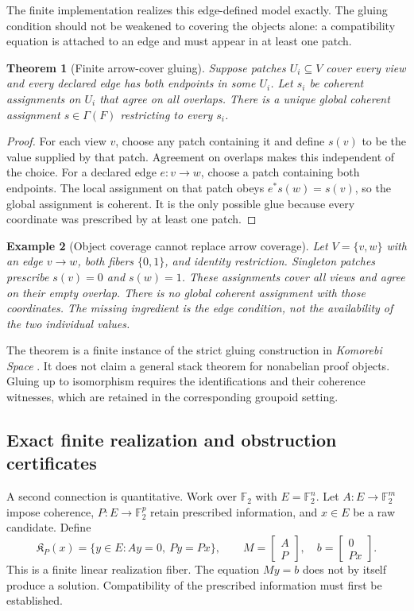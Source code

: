 \documentclass[11pt,oneside]{article}
\theoremstyle{komorebiplain}
\newtheorem{theorem}{Theorem}[section]
\theoremstyle{komorebidefinition}
\newtheorem{example}[theorem]{Example}
\theoremstyle{komorebiremark}
\begin{document}
The finite implementation  realizes this edge-defined model exactly. The gluing condition should not be weakened to covering the objects alone: a compatibility equation is attached to an edge and must appear in at least one patch.

\begin{theorem}[Finite arrow-cover gluing]
\label{res:23:2}
Suppose patches $U_i\subseteq V$ cover every view and every declared edge has both endpoints in some $U_i$. Let $s_i$ be coherent assignments on $U_i$ that agree on all overlaps. There is a unique global coherent assignment $s\in\Gamma(F)$ restricting to every $s_i$.
\end{theorem}
\begin{proof}
For each view $v$, choose any patch containing it and define $s(v)$ to be the value supplied by that patch. Agreement on overlaps makes this independent of the choice. For a declared edge $e:v\to w$, choose a patch containing both endpoints. The local assignment on that patch obeys $e^*s(w)=s(v)$, so the global assignment is coherent. It is the only possible glue because every coordinate was prescribed by at least one patch.
\end{proof}

\begin{example}[Object coverage cannot replace arrow coverage]
\label{res:23:3}
Let $V=\{v,w\}$ with an edge $v\to w$, both fibers $\{0,1\}$, and identity restriction. Singleton patches prescribe $s(v)=0$ and $s(w)=1$. These assignments cover all views and agree on their empty overlap. There is no global coherent assignment with those coordinates. The missing ingredient is the edge condition, not the availability of the two individual values.
\end{example}

The theorem is a finite instance of the strict gluing construction in \emph{Komorebi Space} \cite{komorebi-space}. It does not claim a general stack theorem for nonabelian proof objects. Gluing up to isomorphism requires the identifications and their coherence witnesses, which are retained in the corresponding groupoid setting.

\subsection{Exact finite realization and obstruction certificates}

A second connection is quantitative. Work over $\mathbb F_2$ with $E=\mathbb F_2^n$. Let $A:E\to\mathbb F_2^m$ impose coherence, $P:E\to\mathbb F_2^p$ retain prescribed information, and $x\in E$ be a raw candidate. Define
\[
\mathfrak K_P(x)=\{y\in E:Ay=0,\ Py=Px\},\qquad
M=\begin{bmatrix}A\\P\end{bmatrix},\quad
b=\begin{bmatrix}0\\Px\end{bmatrix}.
\]
This is a finite linear realization fiber. The equation $My=b$ does not by itself produce a solution. Compatibility of the prescribed information must first be established.
\end{document}
